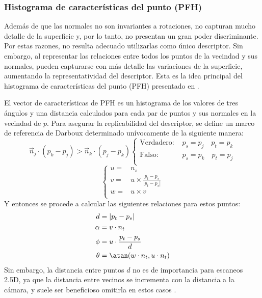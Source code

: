 \subsubsection{Histograma de características del punto (PFH)}
Además de que las normales no son invariantes a rotaciones, no capturan mucho
detalle de la superficie y, por lo tanto, no presentan un gran poder
discriminante. Por estas razones, no resulta adecuado utilizarlas como único descriptor. 
Sin embargo, al representar las relaciones entre todos los puntos de la vecindad y sus normales,
pueden capturarse con más detalle las variaciones de la superficie,
aumentando la representatividad del descriptor. 
Esta es la idea principal del histograma de características del punto (PFH) presentado en \cite{RusuDoctoralDissertation}.

El vector de características de PFH es un histograma de los valores de tres ángulos
y una distancia calculados para cada par de puntos y sus normales en la vecindad de $p$.
Para asegurar la replicabilidad del descriptor, se define un marco de referencia de Darboux
determinado unívocamente de la siguiente manera:
\[
	\vec{n}_j \cdot (p_k - p_j) > \vec{n}_k \cdot (p_j - p_k)
			\begin{cases}
				\text{Verdadero: }& p_s = p_j \quad p_t = p_k\\
				\text{Falso: }& p_s = p_k \quad p_t = p_j\\
			\end{cases}
\]
\[
	\begin{cases}
		u =& n_s \\
		v =& u \times \displaystyle\frac{p_t - p_s}{|p_t - p_s|} \\
		w =& u \times v \\
	\end{cases}
\]
Y entonces se procede a calcular las siguientes relaciones para estos puntos:
	\begin{align*}
		d        &= |p_t - p_s| \\
		\alpha   &= v \cdot n_t \\
		\phi     &= u \cdot \frac{p_t - p_s}{d}\\
		\theta   &= \atan(w \cdot n_t, u \cdot n_t)
	\end{align*}
Sin embargo, la distancia entre puntos $d$ no es de importancia para escaneos 2.5D,
ya que la distancia entre vecinos se incrementa con la distancia a la cámara,
y suele ser beneficioso omitirla en estos casos \cite{RusuDoctoralDissertation}.

